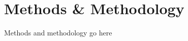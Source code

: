 
\section{Methods \& Methodology}
\label{sec:MethodsAndMethodology}

\large{\raggedright
Methods and methodology go here\\
}
